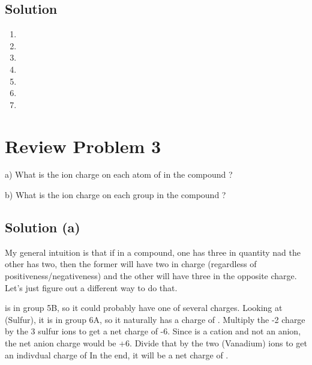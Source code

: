 \documentclass[10pt]{article}
\begin{document}
        \subsection{Solution}
            \begin{multicols}{4}
                \begin{enumerate}[label=\alph*)]
                    \item   {}
                    \item   {}
                    \item   {}
                    \item   {}
                    \item   {}
                    \item   {}
                    \item   {}
                \end{enumerate}
            \end{multicols}

    \pagebreak
    \section{Review Problem 3}
        a) What is the ion charge on each atom of  in the compound ?

        \noindent 
        b) What is the ion charge on each  group in the compound ?

        \subsection{Solution (a)}
            My general intuition is that if in a compound, one has three in quantity nad the other has two, then the former will have two in charge (regardless of positiveness/negativeness) and the other will have three in the opposite charge.
            Let's just figure out a different way to do that.

             is in group 5B, so it could probably have one of several charges. 
            Looking at  (Sulfur), it is in group 6A, so it naturally has a charge of .
            Multiply the -2 charge by the 3 sulfur ions to get a net charge of -6.
            Since  is a cation and not an anion, the net anion charge would be +6.
            Divide that by the two  (Vanadium) ions to get an indivdual charge of 
            In the end, it will be a net charge of .
\end{document}
